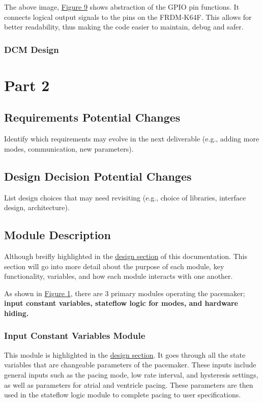 \documentclass{article}
\begin{document}
The above image, \hyperref[HardHide]{Figure 9} shows abstraction of the GPIO pin functions. 
It connects logical output signals to the pins on the FRDM-K64F. This allows for better readability,
thus making the code easier to maintain, debug and safer. 

\newpage
\subsubsection{DCM Design}

\newpage
\section{Part 2}

\subsection{Requirements Potential Changes}
Identify which requirements may evolve in the next deliverable (e.g., adding more modes, communication, new parameters).

\subsection{Design Decision Potential Changes}
List design choices that may need revisiting (e.g., choice of libraries, interface design, architecture).

\newpage
\subsection{Module Description}

Although breifly highlighted in the \hyperref[dessec]{design section} of this documentation. This section will go 
into more detail about the purpose of each module, key functionality, variables, and how each module interacts with 
one another. 

As shown in \hyperref[SimWholeView]{Figure 1}, there are 3 primary modules operating the pacemaker; \textbf{input constant variables, 
stateflow logic for modes, and hardware hiding.}

\subsubsection{Input Constant Variables Module}
This module is highlighted in the \hyperref[dessec]{design section}. It goes through all the state variables that 
are changeable parameters of the pacemaker. These inputs include general inputs such as the pacing mode, low rate interval, and hysteresis settings, as well 
as parameters for atrial and ventricle pacing. These parameters are then used in the stateflow logic module to 
complete pacing to user specifications.
\end{document}
